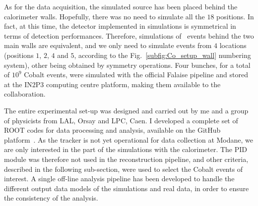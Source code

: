 As for the data acquisition, the simulated source has been placed behind the calorimeter walls.
Hopefully, there was no need to simulate all the $18$ positions.
In fact, at this time, the detector implemented in simulations is symmetrical in terms of detection performances.
Therefore, simulations of \Co\ events behind the two main walls are equivalent, and we only need to simulate events from $4$ locations (positions $1$, $2$, $4$ and $5$, according to the Fig.~\ref{subfig:Co_setup_wall} numbering system), other being obtained by symmetry operations.
Four bunches, for a total of $10^{9}$ Cobalt events, were simulated with the official Falaise pipeline and stored at the IN$2$P$3$ computing centre platform, making them available to the collaboration.


The entire experimental set-up was designed and carried out by me and a group of physicists from LAL, Orsay and LPC, Caen.
I developed a complete set of ROOT codes for data processing and analysis, available on the GitHub platform~\cite{myGit}.
As the tracker is not yet operational for data collection at Modane, we are only interested in the part of the simulations with the calorimeter.
The PID module was therefore not used in the reconstruction pipeline, and other criteria, described in the following sub-section, were used to select the Cobalt events of interest.
A single off-line analysis pipeline has been developed to handle the different output data models of the simulations and real data, in order to ensure the consistency of the analysis.

